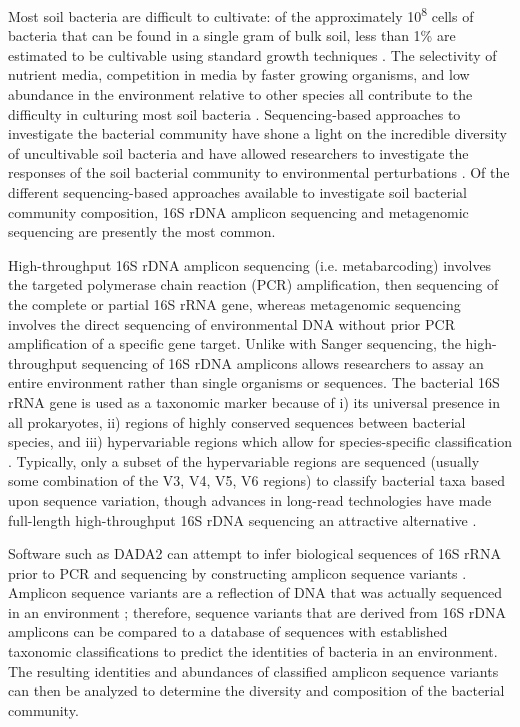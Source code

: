 Most soil bacteria are difficult to cultivate:
of the approximately 10\textsuperscript{8} cells of bacteria that can be found in a single gram of bulk soil, less than 1\% are estimated to be cultivable using standard growth techniques \parencite{Raynaud.2014, vanPham.2012}.
The selectivity of nutrient media, competition in media by faster growing organisms, and low abundance in the environment relative to other species all contribute to the difficulty in culturing most soil bacteria \parencite{daRocha.2019}.
Sequencing-based approaches to investigate the bacterial community have shone a light on the incredible diversity of uncultivable soil bacteria \parencite{Hug.2016} and have allowed researchers to investigate the responses of the soil bacterial community to environmental perturbations \parencite{Isobe.2019, Isobe.2020}.
Of the different sequencing-based approaches available to investigate soil bacterial community composition, 16S rDNA amplicon sequencing and metagenomic sequencing are presently the most common.

High-throughput 16S rDNA amplicon sequencing (i.e. metabarcoding) involves the targeted polymerase chain reaction (PCR) amplification, then sequencing of the complete or partial 16S rRNA gene, whereas metagenomic sequencing involves the direct sequencing of environmental DNA without prior PCR amplification of a specific gene target.
Unlike with Sanger sequencing, the high-throughput sequencing of 16S rDNA amplicons allows researchers to assay an entire environment rather than single organisms or sequences.
The bacterial 16S rRNA gene is used as a taxonomic marker because of i) its universal presence in all prokaryotes, ii) regions of highly conserved sequences between bacterial species, and iii) hypervariable regions which allow for species-specific classification \parencite{vanPham.2012}.
Typically, only a subset of the hypervariable regions are sequenced (usually some combination of the V3, V4, V5, V6 regions) to classify bacterial taxa based upon sequence variation, though advances in long-read technologies have made full-length high-throughput 16S rDNA sequencing an attractive alternative \parencite{Yang.2016, Shin.2016, Numberger.2019}.

Software such as DADA2 can attempt to infer biological sequences of 16S rRNA prior to PCR and sequencing by constructing amplicon sequence variants \parencite{Bolyen.2019, Callahan.2016}.
Amplicon sequence variants are a reflection of DNA that was actually sequenced in an environment \parencite{Callahan.2017};
therefore, sequence variants that are derived from 16S rDNA amplicons can be compared to a database of sequences with established taxonomic classifications to predict the identities of bacteria in an environment.
The resulting identities and abundances of classified amplicon sequence variants can then be analyzed to determine the diversity and composition of the bacterial community.

